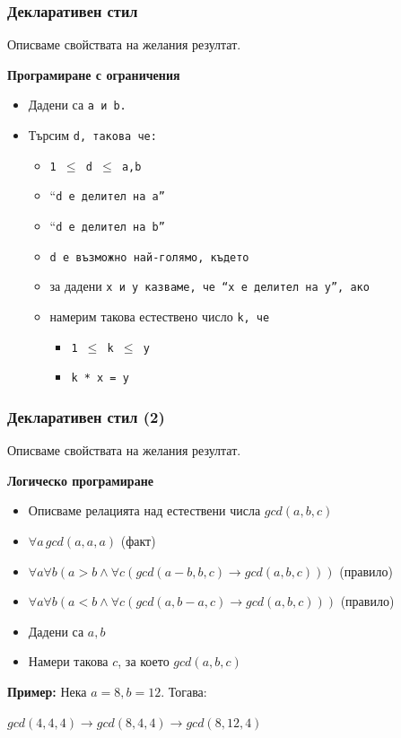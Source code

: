\documentclass{beamer}
\begin{document}
\begin{frame}
  \frametitle{Декларативен стил}

  Описваме свойствата на желания резултат.
  \vspace{1em}

  \textbf{Програмиране с ограничения}

  \begin{itemize}
  \item Дадени са \tt a и \tt b.
  \item Търсим \tt d, такова че:
    \begin{itemize}
    \item \tt{1 $\leq$ d $\leq$ a,b}
    \item ``\tt d е делител на \tt a''
    \item ``\tt d е делител на \tt b''
    \item \tt d е възможно най-голямо, където
    \item за дадени \tt x и \tt y казваме, че ``\tt x е делител на \tt y'', ако
    \item намерим такова естествено число \tt k, че
      \begin{itemize}
      \item \tt{1 $\leq$ k $\leq$ y}
      \item \tt k * \tt x = \tt y
      \end{itemize}
    \end{itemize}
  \end{itemize}
\end{frame}

\begin{frame}
  \frametitle{Декларативен стил (2)}

  Описваме свойствата на желания резултат.
  \vspace{1em}

  \textbf{Логическо програмиране}

  \begin{itemize}
  \item Описваме релацията над естествени числа $gcd(a,b,c)$
  \item $\forall a \, gcd(a,a,a)$ (факт)

  \item $\forall a\forall b ( a > b \land \forall c (gcd(a-b,b,c) \rightarrow gcd(a,b,c)))$ (правило)
  \item $\forall a\forall b ( a < b \land \forall c (gcd(a,b-a,c) \rightarrow gcd(a,b,c)))$ (правило)
  \item Дадени са $a, b$
  \item Намери такова $c$, за което $gcd(a,b,c)$
  \end{itemize}

  \pause

  \textbf{Пример:}
  Нека $a = 8, b = 12$. Тогава:

  $gcd(4,4,4) \rightarrow gcd(8,4,4) \rightarrow gcd(8,12,4)$
\end{frame}
\end{document}
